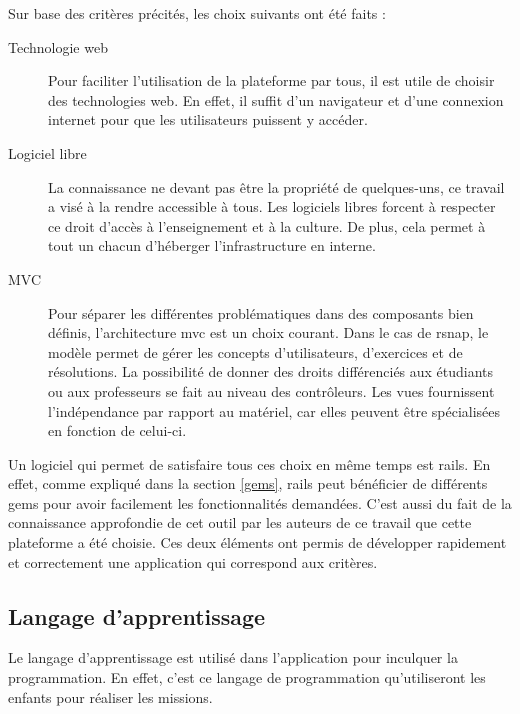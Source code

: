 Sur base des critères précités, les choix suivants ont été faits :
\begin{description}
  \item[Technologie web] Pour faciliter l'utilisation de la plateforme par tous, il est utile de choisir des technologies web. En effet, il suffit d'un navigateur et d'une connexion internet pour que les utilisateurs puissent y accéder.
  \item[Logiciel libre] La connaissance ne devant pas être la propriété de quelques-uns, ce travail a visé à la rendre accessible à tous. Les logiciels libres forcent à respecter ce droit d'accès à l'enseignement et à la culture. De plus, cela permet à tout un chacun d'héberger l'infrastructure en interne.
  \item[MVC] Pour séparer les différentes problématiques dans des composants bien définis, l'architecture \gls{mvc} est un choix courant. Dans le cas de \gls{rsnap}, le modèle permet de gérer les concepts d'utilisateurs, d'exercices et de résolutions. La possibilité de donner des droits différenciés aux étudiants ou aux professeurs se fait au niveau des contrôleurs. Les vues fournissent l'indépendance par rapport au matériel, car elles peuvent être spécialisées en fonction de celui-ci.
\end{description}
Un logiciel qui permet de satisfaire tous ces choix en même temps est \gls{rails}. En effet, comme expliqué dans la section \ref{gems}, \gls{rails} peut bénéficier de différents \glspl{gem}  pour avoir facilement les fonctionnalités demandées. C'est aussi du fait de la connaissance approfondie de cet outil par les auteurs de ce travail que cette plateforme a été choisie. Ces deux éléments ont permis de développer rapidement et correctement une application qui correspond aux critères.

\subsection{Langage d'apprentissage}
Le langage d'apprentissage est utilisé dans l'application pour inculquer la programmation. En effet, c'est ce langage de programmation qu'utiliseront les enfants pour réaliser les \glspl{mission}.

